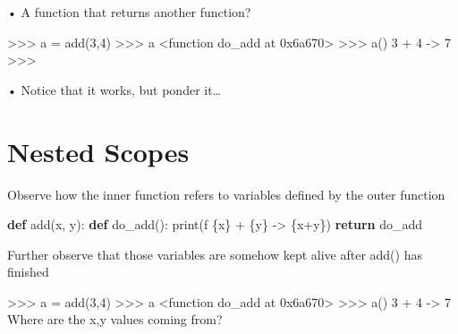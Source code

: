 \documentclass[
  letterpaper,
  DIV=11,
  numbers=noendperiod]{scrreprt}
\newenvironment{Shaded}{\begin{snugshade}}{\end{snugshade}}
\newcommand{\BuiltInTok}[1]{\textcolor[rgb]{0.00,0.23,0.31}{#1}}
\newcommand{\ControlFlowTok}[1]{\textcolor[rgb]{0.00,0.23,0.31}{\textbf{#1}}}
\newcommand{\KeywordTok}[1]{\textcolor[rgb]{0.00,0.23,0.31}{\textbf{#1}}}
\newcommand{\NormalTok}[1]{\textcolor[rgb]{0.00,0.23,0.31}{#1}}
\newcommand{\OperatorTok}[1]{\textcolor[rgb]{0.37,0.37,0.37}{#1}}
\newcommand{\SpecialCharTok}[1]{\textcolor[rgb]{0.37,0.37,0.37}{#1}}
\newcommand{\SpecialStringTok}[1]{\textcolor[rgb]{0.13,0.47,0.30}{#1}}
\begin{document}
• A function that returns another function?

\begin{Shaded}
\begin{Highlighting}[]
\NormalTok{\textgreater{}\textgreater{}\textgreater{} a = add(3,4)  }
\NormalTok{\textgreater{}\textgreater{}\textgreater{} a  }
\NormalTok{\textless{}function do\_add at 0x6a670\textgreater{}  }
\NormalTok{\textgreater{}\textgreater{}\textgreater{} a()  }
\NormalTok{3 + 4 {-}\textgreater{} 7  }
\NormalTok{\textgreater{}\textgreater{}\textgreater{} }
\end{Highlighting}
\end{Shaded}

• Notice that it works, but ponder it\ldots{}


\chapter{Nested Scopes}\label{nested-scopes}

Observe how the inner function refers to variables defined by the outer
function

\begin{Shaded}
\begin{Highlighting}[]
\KeywordTok{def}\NormalTok{ add(x, y):}
    \KeywordTok{def}\NormalTok{ do\_add():}
        \BuiltInTok{print}\NormalTok{(}\SpecialStringTok{f\textquotesingle{} }\SpecialCharTok{\{}\NormalTok{x}\SpecialCharTok{\}}\SpecialStringTok{ + }\SpecialCharTok{\{}\NormalTok{y}\SpecialCharTok{\}}\SpecialStringTok{ {-}\textgreater{} }\SpecialCharTok{\{}\NormalTok{x}\OperatorTok{+}\NormalTok{y}\SpecialCharTok{\}}\SpecialStringTok{\textquotesingle{}}\NormalTok{)}
    \ControlFlowTok{return}\NormalTok{ do\_add }
\end{Highlighting}
\end{Shaded}

Further observe that those variables are somehow kept alive after add()
has finished

\begin{Shaded}
\begin{Highlighting}[]
\NormalTok{\textgreater{}\textgreater{}\textgreater{} a = add(3,4)  }
\NormalTok{\textgreater{}\textgreater{}\textgreater{} a  }
\NormalTok{\textless{}function do\_add at 0x6a670\textgreater{}  }
\NormalTok{\textgreater{}\textgreater{}\textgreater{} a()  }
\NormalTok{3 + 4 {-}\textgreater{} 7  }
\NormalTok{Where are the x,y values coming from? }
\end{Highlighting}
\end{Shaded}
\end{document}
